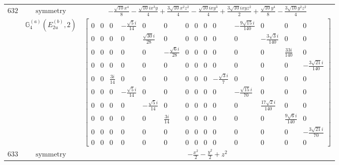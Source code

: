 \documentclass[fleqn,8pt,landscape]{jsarticle}
\begin{document}
\begin{longtable}{ccc}
$ 632 $ & $ \text{symmetry} $ & $ - \frac{\sqrt{10} x^{4}}{8} - \frac{\sqrt{10} i x^{3} y}{4} + \frac{3 \sqrt{10} x^{2} z^{2}}{4} - \frac{\sqrt{10} i x y^{3}}{4} + \frac{3 \sqrt{10} i x y z^{2}}{2} + \frac{\sqrt{10} y^{4}}{8} - \frac{3 \sqrt{10} y^{2} z^{2}}{4} $ \\
$  $ & $ \mathbb{G}_{4}^{(a)}(E_{2u}^{(b)},2) $ & $ \begin{bmatrix} 0 & 0 & 0 & - \frac{\sqrt{5} i}{14} & 0 & 0 & 0 & 0 & 0 & 0 & - \frac{9 \sqrt{15} i}{140} & 0 & 0 & 0 \\ 0 & 0 & 0 & 0 & \frac{\sqrt{30} i}{28} & 0 & 0 & 0 & 0 & 0 & 0 & - \frac{3 \sqrt{3} i}{140} & 0 & 0 \\ 0 & 0 & 0 & 0 & 0 & - \frac{\sqrt{6} i}{28} & 0 & 0 & 0 & 0 & 0 & 0 & \frac{33 i}{140} & 0 \\ 0 & 0 & 0 & 0 & 0 & 0 & 0 & 0 & 0 & 0 & 0 & 0 & 0 & - \frac{3 \sqrt{21} i}{140} \\ 0 & 0 & \frac{3 i}{14} & 0 & 0 & 0 & 0 & 0 & 0 & - \frac{\sqrt{3} i}{7} & 0 & 0 & 0 & 0 \\ 0 & 0 & 0 & - \frac{\sqrt{5} i}{14} & 0 & 0 & 0 & 0 & 0 & 0 & - \frac{\sqrt{15} i}{70} & 0 & 0 & 0 \\ 0 & 0 & 0 & 0 & - \frac{\sqrt{5} i}{14} & 0 & 0 & 0 & 0 & 0 & 0 & \frac{17 \sqrt{2} i}{140} & 0 & 0 \\ 0 & 0 & 0 & 0 & 0 & \frac{3 i}{14} & 0 & 0 & 0 & 0 & 0 & 0 & \frac{9 \sqrt{6} i}{140} & 0 \\ 0 & 0 & 0 & 0 & 0 & 0 & 0 & 0 & 0 & 0 & 0 & 0 & 0 & - \frac{3 \sqrt{21} i}{70} \\ 0 & 0 & 0 & 0 & 0 & 0 & 0 & 0 & 0 & 0 & 0 & 0 & 0 & 0 \end{bmatrix} $ \\ \hline
$ 633 $ & $ \text{symmetry} $ & $ - \frac{x^{2}}{2} - \frac{y^{2}}{2} + z^{2} $ \\

\end{longtable}
\end{document}
